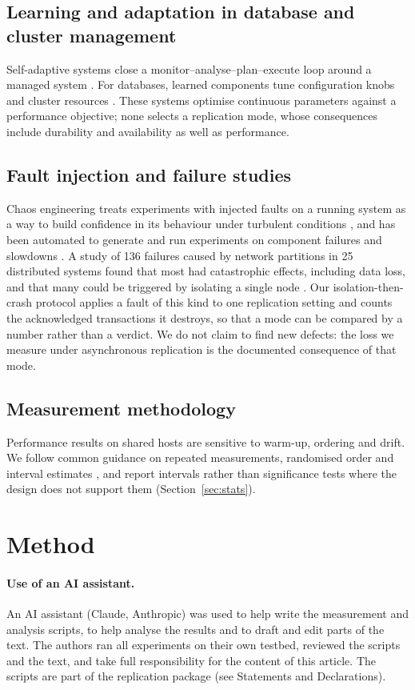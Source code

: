 \documentclass[smallextended]{svjour3}
\begin{document}
\subsection{Learning and adaptation in database and cluster management}
Self-adaptive systems close a monitor--analyse--plan--execute loop around a managed system \cite{kephart2003}. For databases, learned components tune configuration knobs \cite{vanaken2017,zhang2019,kanellis2022,lao2024,wang2021} and cluster resources \cite{rzadca2020,qiu2020}. These systems optimise continuous parameters against a performance objective; none selects a replication mode, whose consequences include durability and availability as well as performance.

\subsection{Fault injection and failure studies}
Chaos engineering treats experiments with injected faults on a running system as a way to build confidence in its behaviour under turbulent conditions \cite{basiri2016}, and has been automated to generate and run experiments on component failures and slowdowns \cite{basiri2019}. A study of 136 failures caused by network partitions in 25 distributed systems found that most had catastrophic effects, including data loss, and that many could be triggered by isolating a single node \cite{alquraan2018}. Our isolation-then-crash protocol applies a fault of this kind to one replication setting and counts the acknowledged transactions it destroys, so that a mode can be compared by a number rather than a verdict. We do not claim to find new defects: the loss we measure under asynchronous replication is the documented consequence of that mode.

\subsection{Measurement methodology}
Performance results on shared hosts are sensitive to warm-up, ordering and drift. We follow common guidance on repeated measurements, randomised order and interval estimates \cite{georges2007,kalibera2013}, and report intervals rather than significance tests where the design does not support them (Section~\ref{sec:stats}).

\section{Method}\label{sec:method}
\paragraph{Use of an AI assistant.} An AI assistant (Claude, Anthropic) was used to help write the measurement and analysis scripts, to help analyse the results and to draft and edit parts of the text. The authors ran all experiments on their own testbed, reviewed the scripts and the text, and take full responsibility for the content of this article. The scripts are part of the replication package (see Statements and Declarations).
\end{document}

